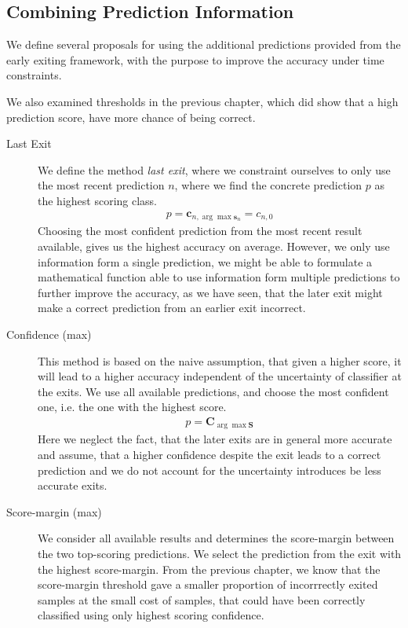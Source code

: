 \subsection{Combining Prediction Information}


We define several proposals for using the additional predictions provided from the early exiting framework, with the purpose to improve the accuracy under time constraints. 

We also examined thresholds in the previous chapter, which did show that a high prediction score, have more chance of being correct.       

\begin{description}
	\item[Last Exit] We define the method \emph{last exit}, where we constraint ourselves to only use the most recent prediction $n$, where we find the concrete prediction $p$ as the highest scoring class. 
	\begin{align*}
		p = \mathbf{c}_{n, \arg \max  \mathbf{s}_n} = c_{n,0}
	\end{align*}
	 Choosing the most confident prediction from the most recent result available, gives us the highest accuracy on average. However, we only use information form a single prediction, we might be able to formulate a mathematical function able to use information form multiple predictions to further improve the accuracy, as we have seen, that the later exit might make a correct prediction from an earlier exit incorrect. 
	 
	\item[Confidence (max)] This method is based on the naive assumption, that given a higher score, it will lead to a higher accuracy independent of the uncertainty of classifier at the exits. We use all available predictions, and choose the most confident one, i.e. the one with the highest score.
	\begin{align*}
	p = \mathbf{C}_{\arg \max  \mathbf{S}}
	\end{align*}
	Here we neglect the fact, that the later exits are in general more accurate and assume, that a higher confidence despite the exit leads to a correct prediction and we do not account for the uncertainty introduces be less accurate exits.
	\item[Score-margin (max)] We consider all available results and determines the score-margin between the two top-scoring predictions. We select the prediction from the exit with the highest score-margin. From the previous chapter, we know that the score-margin threshold gave a smaller proportion of incorrrectly exited samples at the small cost of samples, that could have been correctly classified using only highest scoring confidence.
	

\end{description}
